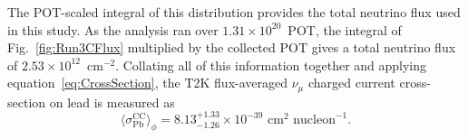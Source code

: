 The POT-scaled integral of this distribution provides the total neutrino flux used in this study.  As the analysis ran over $1.31\times10^{20}$~POT, the integral of Fig.~\ref{fig:Run3CFlux} multiplied by the collected POT gives a total neutrino flux of $2.53\times10^{12}$~cm$^{-2}$.
\newline
\newline
Collating all of this information together and applying equation~\ref{eq:CrossSection}, the T2K flux-averaged $\nu_\mu$ charged current cross-section on lead is measured as 
\begin{equation}
\langle \sigma^{\textrm{CC}}_{\textrm{Pb}} \rangle_{\phi} = 8.13^{+1.33}_{-1.26} \times 10^{-39} \textrm{ cm}^2 \textrm{ nucleon}^{-1}.
\end{equation}





